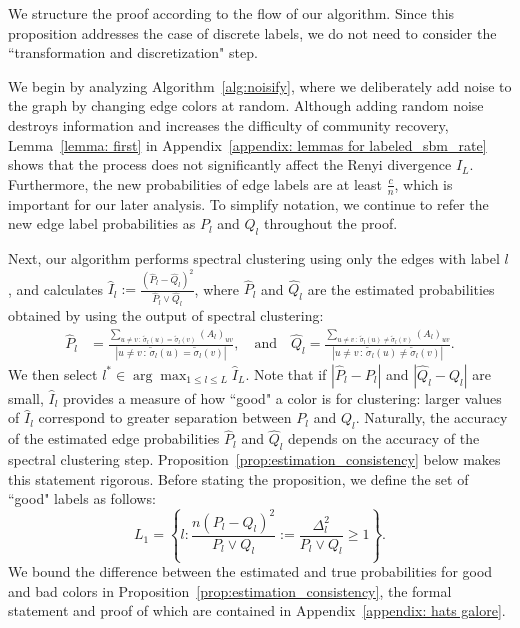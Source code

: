 \documentclass{article}
\begin{document}
We structure the proof according to the flow of our algorithm. Since this proposition addresses the case of discrete labels, we do not need to consider the ``transformation and discretization" step.

We begin by analyzing Algorithm~\ref{alg:noisify}, where we deliberately add noise to the graph by changing edge colors at random. Although adding random noise destroys information and increases the difficulty of community recovery, Lemma~\ref{lemma: first} in Appendix~\ref{appendix: lemmas for labeled_sbm_rate} shows that the process does not significantly affect the Renyi divergence $I_L$. Furthermore, the new probabilities of edge labels are at least $\frac{c}{n}$, which is important for our later analysis. To simplify notation, we continue to refer the new edge label probabilities as $P_l$ and $Q_l$ throughout the proof.

Next, our algorithm performs spectral clustering using only the edges with label $l$, and calculates $\hat I_l := \frac{(\hat P_l - \hat Q_l)^2}{\hat P_l \vee \hat Q_l}$, where $\hat P_l$ and $\hat Q_l$ are the estimated probabilities obtained by using the output of spectral clustering:
\begin{align*}
\hat P_l &= \frac{ \sum_{u \neq v \,:\, \tilde{\sigma}_l(u) = \tilde{\sigma}_l(v) } (A_l)_{uv} }{ |{u \neq v \,:\, \tilde{\sigma}_l(u) = \tilde{\sigma}_l(v) }| }, \quad \text{and} \quad \hat{Q}_l =  \frac{ \sum_{u \neq v \,:\, \tilde{\sigma}_l(u) \neq \tilde{\sigma}_l(v) } (A_l)_{uv} }{ |{u \neq v \,:\, \tilde{\sigma}_l(u) \neq \tilde{\sigma}_l(v) }| }.
\end{align*}
We then select $l^* \in \arg\max_{1 \le l \le L} \hat I_L$. Note that if $|\hat P_l - P_l|$ and $|\hat Q_l - Q_l|$ are small, $\hat I_l$ provides a measure of how ``good" a color is for clustering: larger values of $\hat I_l$ correspond to greater separation between $P_l$ and $Q_l$. Naturally, the accuracy of the estimated edge probabilities $\hat P_l$ and $\hat Q_l$ depends on the accuracy of the spectral clustering step. Proposition~\ref{prop:estimation_consistency} below makes this statement rigorous. Before stating the proposition, we define the set of ``good" labels as follows:
$$L_1 = \left\{ l : \frac{n(P_l-Q_l)^2}{P_l \vee Q_l} := \frac{\Delta_l^2}{P_l \vee Q_l} \geq 1 \right\}.$$
We bound the difference between the estimated and true probabilities for good and bad colors in Proposition~\ref{prop:estimation_consistency}, the formal statement and proof of which are contained in Appendix~\ref{appendix: hats galore}.
\end{document}
